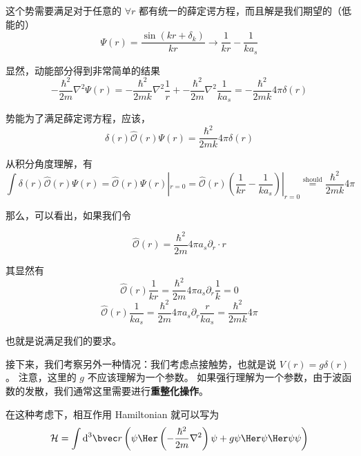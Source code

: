 这个势需要满足对于任意的 $\forall r$ 都有统一的薛定谔方程，而且解是我们期望的（低能的）
\begin{equation}
\Psi(r) = \frac{\sin(kr+\delta_k)}{kr}\to \frac{1}{kr} - \frac{1}{ka_s}
\end{equation}

显然，动能部分得到非常简单的结果
\begin{equation}
-\frac{\hbar^2}{2m}\nabla^2\Psi(r) = -\frac{\hbar^2}{2mk}\nabla^2 \frac{1}{r} + -\frac{\hbar^2}{2m}\nabla^2\frac{1}{ka_s} = -\frac{\hbar^2}{2mk}4\pi\delta(r)
\end{equation}

势能为了满足薛定谔方程，应该，
\begin{equation}
\delta(r)\hat{\mathcal{O}}(r)\Psi(r) = \frac{\hbar^2}{2mk}4\pi\delta(r)
\end{equation}

从积分角度理解，有
\begin{equation}
\int\delta(r)\hat{\mathcal{O}}(r)\Psi(r) = \hat{\mathcal{O}}(r)\Psi(r)|_{r=0} =  \hat{\mathcal{O}}(r)\left(\frac{1}{kr} - \frac{1}{ka_s}\right)|_{r=0} \overset{\text{should}}{=} \frac{\hbar^2}{2mk}4\pi
\end{equation}

那么，可以看出，如果我们令

\begin{equation}
\hat{\mathcal{O}}(r) = \frac{\hbar^2}{2m}4\pi a_s \partial_r\cdot r
\end{equation}

其显然有
\begin{equation}
\hat{\mathcal{O}}(r)\frac{1}{kr} = \frac{\hbar^2}{2m}4\pi a_s \partial_r \frac{1}{k} = 0
\end{equation}
\begin{equation}
\hat{\mathcal{O}}(r)\frac{1}{ka_s} = \frac{\hbar^2}{2m}4\pi a_s \partial_r \frac{r}{ka_s} = \frac{\hbar^2}{2mk}4\pi
\end{equation}

也就是说满足我们的要求。

接下来，我们考察另外一种情况：我们考虑点接触势，也就是说 $V(r) = g\delta(r)$。 注意，这里的 $g$ 不应该理解为一个参数。 如果强行理解为一个参数，由于波函数的发散，我们通常这里需要进行\textbf{重整化操作}。

在这种考虑下，相互作用 Hamiltonian 就可以写为
\begin{equation}
\mathcal{H} = \int \text{d}^3{\bvec r}\left(\psi\Her\left(-\frac{\hbar^2}{2m}\nabla^2\right)\psi+g\psi\Her\psi\Her\psi\psi\right)
\end{equation}

